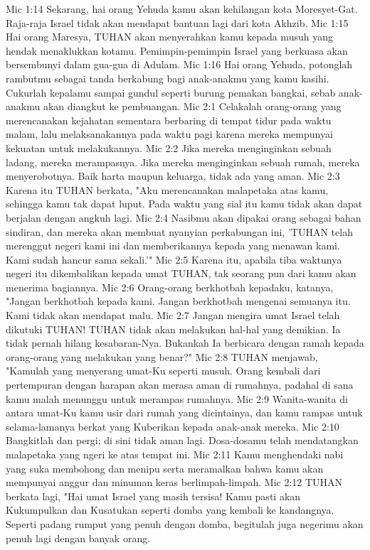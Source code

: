 Mic 1:14  Sekarang, hai orang Yehuda kamu akan kehilangan kota Moresyet-Gat. Raja-raja Israel tidak akan mendapat bantuan lagi dari kota Akhzib.
Mic 1:15  Hai orang Maresya, TUHAN akan menyerahkan kamu kepada musuh yang hendak menaklukkan kotamu. Pemimpin-pemimpin Israel yang berkuasa akan bersembunyi dalam gua-gua di Adulam.
Mic 1:16  Hai orang Yehuda, potonglah rambutmu sebagai tanda berkabung bagi anak-anakmu yang kamu kasihi. Cukurlah kepalamu sampai gundul seperti burung pemakan bangkai, sebab anak-anakmu akan diangkut ke pembuangan.
Mic 2:1  Celakalah orang-orang yang merencanakan kejahatan sementara berbaring di tempat tidur pada waktu malam, lalu melaksanakannya pada waktu pagi karena mereka mempunyai kekuatan untuk melakukannya.
Mic 2:2  Jika mereka menginginkan sebuah ladang, mereka merampasnya. Jika mereka menginginkan sebuah rumah, mereka menyerobotnya. Baik harta maupun keluarga, tidak ada yang aman.
Mic 2:3  Karena itu TUHAN berkata, "Aku merencanakan malapetaka atas kamu, sehingga kamu tak dapat luput. Pada waktu yang sial itu kamu tidak akan dapat berjalan dengan angkuh lagi.
Mic 2:4  Nasibmu akan dipakai orang sebagai bahan sindiran, dan mereka akan membuat nyanyian perkabungan ini, 'TUHAN telah merenggut negeri kami ini dan memberikannya kepada yang menawan kami. Kami sudah hancur sama sekali.'"
Mic 2:5  Karena itu, apabila tiba waktunya negeri itu dikembalikan kepada umat TUHAN, tak seorang pun dari kamu akan menerima bagiannya.
Mic 2:6  Orang-orang berkhotbah kepadaku, katanya, "Jangan berkhotbah kepada kami. Jangan berkhotbah mengenai semuanya itu. Kami tidak akan mendapat malu.
Mic 2:7  Jangan mengira umat Israel telah dikutuki TUHAN! TUHAN tidak akan melakukan hal-hal yang demikian. Ia tidak pernah hilang kesabaran-Nya. Bukankah Ia berbicara dengan ramah kepada orang-orang yang melakukan yang benar?"
Mic 2:8  TUHAN menjawab, "Kamulah yang menyerang umat-Ku seperti musuh. Orang kembali dari pertempuran dengan harapan akan merasa aman di rumahnya, padahal di sana kamu malah menunggu untuk merampas rumahnya.
Mic 2:9  Wanita-wanita di antara umat-Ku kamu usir dari rumah yang dicintainya, dan kamu rampas untuk selama-lamanya berkat yang Kuberikan kepada anak-anak mereka.
Mic 2:10  Bangkitlah dan pergi; di sini tidak aman lagi. Dosa-dosamu telah mendatangkan malapetaka yang ngeri ke atas tempat ini.
Mic 2:11  Kamu menghendaki nabi yang suka membohong dan menipu serta meramalkan bahwa kamu akan mempunyai anggur dan minuman keras berlimpah-limpah.
Mic 2:12  TUHAN berkata lagi, "Hai umat Israel yang masih tersisa! Kamu pasti akan Kukumpulkan dan Kusatukan seperti domba yang kembali ke kandangnya. Seperti padang rumput yang penuh dengan domba, begitulah juga negerimu akan penuh lagi dengan banyak orang.
